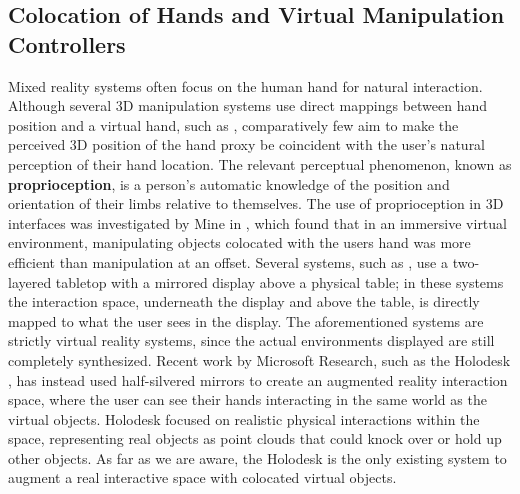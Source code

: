 \documentclass[pageno]{jpaper}
\begin{document}
\subsection{Colocation of Hands and Virtual Manipulation Controllers}
Mixed reality systems often focus on the human hand for natural interaction. 
Although several 3D manipulation systems use direct mappings between hand position and a virtual hand, such as \cite{poupyrev1996go},
comparatively few aim to make the perceived 3D position of the hand proxy be coincident with the user's natural perception of their
hand location. The relevant perceptual phenomenon, known as {\bf proprioception}, is a person's automatic knowledge of the position and orientation of their
limbs relative to themselves. The use of proprioception in 3D interfaces was investigated by Mine in \cite{mine1997exploiting}, which found that
in an immersive virtual environment, manipulating objects colocated with the users hand was more efficient than manipulation at an offset. Several systems,
such as \cite{mulder2002personal, prachyabrued2011dropping}, use a two-layered tabletop with a mirrored display above a physical table; in these systems the interaction space, underneath
the display and above the table, is directly mapped to what the user sees in the display. The aforementioned systems are strictly virtual reality systems, since the actual environments displayed
are still completely synthesized. Recent work by Microsoft Research, such as the Holodesk \cite{holodesk}, has instead used half-silvered mirrors to create an augmented reality
interaction space, where the user can see their hands interacting in the same world as the virtual objects. Holodesk focused on realistic physical interactions within the space,
representing real objects as point clouds that could knock over or hold up other objects. As far as we are aware, the Holodesk is the only existing system to augment a real
interactive space with colocated virtual objects.
\end{document}
